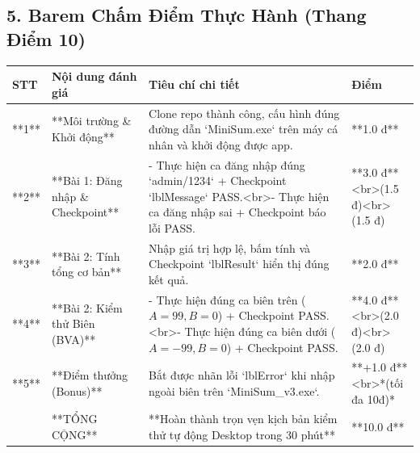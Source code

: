 \subsection{5. Barem Chấm Điểm Thực Hành (Thang Điểm 10)}

\begin{table}[H]
\centering
\begin{tabular}{|l|l|l|l|}
\hline
\textbf{STT} & \textbf{Nội dung đánh giá} & \textbf{Tiêu chí chi tiết} & \textbf{Điểm} \\ \hline
**1** & **Môi trường \& Khởi động** & Clone repo thành công, cấu hình đúng đường dẫn `MiniSum.exe` trên máy cá nhân và khởi động được app. & **1.0 đ** \\ \hline
**2** & **Bài 1: Đăng nhập \& Checkpoint** & - Thực hiện ca đăng nhập đúng `admin/1234` + Checkpoint `lblMessage` PASS.<br>- Thực hiện ca đăng nhập sai + Checkpoint báo lỗi PASS. & **3.0 đ**<br>(1.5 đ)<br>(1.5 đ) \\ \hline
**3** & **Bài 2: Tính tổng cơ bản** & Nhập giá trị hợp lệ, bấm tính và Checkpoint `lblResult` hiển thị đúng kết quả. & **2.0 đ** \\ \hline
**4** & **Bài 2: Kiểm thử Biên (BVA)** & - Thực hiện đúng ca biên trên ($A = 99, B = 0$) + Checkpoint PASS.<br>- Thực hiện đúng ca biên dưới ($A = -99, B = 0$) + Checkpoint PASS. & **4.0 đ**<br>(2.0 đ)<br>(2.0 đ) \\ \hline
**5** & **Điểm thưởng (Bonus)** & Bắt được nhãn lỗi `lblError` khi nhập ngoài biên trên `MiniSum\_v3.exe`. & **+1.0 đ**<br>*(tối đa 10đ)* \\ \hline
 & **TỔNG CỘNG** & **Hoàn thành trọn vẹn kịch bản kiểm thử tự động Desktop trong 30 phút** & **10.0 đ** \\ \hline
\end{tabular}
\end{table}



